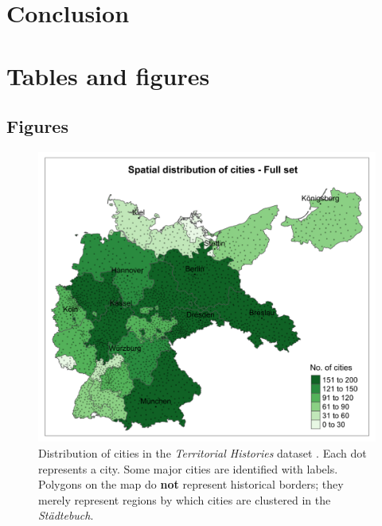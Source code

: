 \documentclass[11pt, a4paper]{article}
\begin{document}

\section{Conclusion} \label{sec:conclusion}

\newpage
\onehalfspacing



\newpage
\section*{Tables and figures}



\subsection*{Figures}

\begin{figure}[ht]
    \centering
    \includegraphics[scale=0.15]{paper/output/descriptive/map_cities_raw.png}
    \caption{Distribution of cities in the \textit{Territorial Histories} dataset \citep{pt2}. Each dot represents a city. Some major cities are identified with labels. Polygons on the map do \textbf{not} represent historical borders; they merely represent regions by which cities are clustered in the \textit{Städtebuch}.}
    \label{fig:map_cities_raw}
\end{figure}
\end{document}
